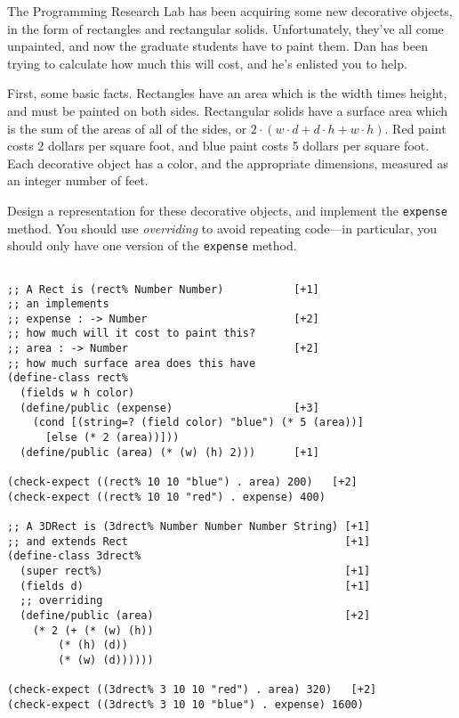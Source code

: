 \documentclass[12pt]{article}                   %
\def\pts#1{\marginpar{\footnotesize \raggedright  \fbox{#1 {\sc Points}}}}
\newenvironment{solution}{}{}
\begin{document}
\ifrubric\else
{}
\fi 

\newpage

\begin{problem}\pts{19}

The Programming Research Lab has been acquiring some new decorative
objects, in the form of rectangles and rectangular solids.
Unfortunately, they've all come unpainted, and now the graduate
students have to paint them.  Dan has been trying to calculate how
much this will cost, and he's enlisted you to help.  

First, some basic facts.  Rectangles have an area which is the width
times height, and must be painted on both sides.  Rectangular solids
have a surface area which is the sum of the areas of all of the
sides, or $2 \cdot (w \cdot d + d \cdot h + w \cdot h)$. Red paint costs 2
dollars per square foot, and blue paint costs 5 dollars per square
foot.  
%
Each decorative object has a color, and the appropriate dimensions,
measured as an integer number of feet.  

Design a representation for these decorative objects, and implement
the {\tt expense} method.  You should use \emph{overriding} to avoid
repeating code---in particular, you should only have one version of
the {\tt expense} method.

\ifrubric\else
{}
\newpage
\fi

\begin{solution}
\begin{verbatim}

;; A Rect is (rect% Number Number)           [+1]
;; an implements
;; expense : -> Number                       [+2]
;; how much will it cost to paint this?
;; area : -> Number                          [+2]
;; how much surface area does this have
(define-class rect%
  (fields w h color)
  (define/public (expense)                   [+3]
    (cond [(string=? (field color) "blue") (* 5 (area))]
	  [else (* 2 (area))]))
  (define/public (area) (* (w) (h) 2)))      [+1]

(check-expect ((rect% 10 10 "blue") . area) 200)   [+2]
(check-expect ((rect% 10 10 "red") . expense) 400)

;; A 3DRect is (3drect% Number Number Number String) [+1]
;; and extends Rect                                  [+1]
(define-class 3drect%
  (super rect%)                                      [+1]
  (fields d)                                         [+1]
  ;; overriding
  (define/public (area)                              [+2]
    (* 2 (+ (* (w) (h))
	    (* (h) (d))
	    (* (w) (d))))))

(check-expect ((3drect% 3 10 10 "red") . area) 320)   [+2]
(check-expect ((3drect% 3 10 10 "blue") . expense) 1600)


\end{verbatim}
\end{solution}
\end{problem}
\newpage
\end{document}
